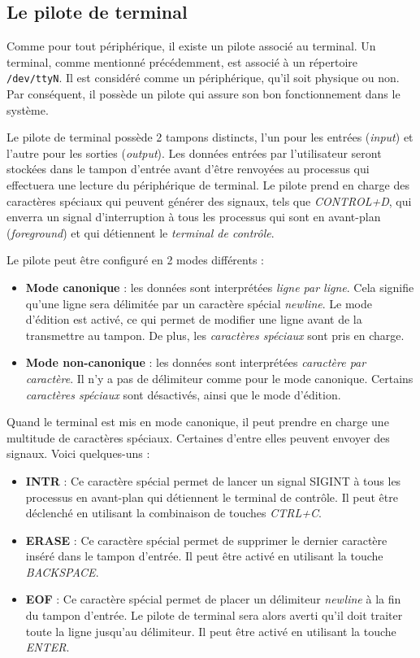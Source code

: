 \subsection{Le pilote de terminal}
Comme pour tout périphérique, il existe un pilote associé au terminal. Un terminal, comme mentionné précédemment, est associé à un répertoire \texttt{/dev/ttyN}. Il est considéré comme un périphérique, qu'il soit physique ou non. Par conséquent, il possède un pilote qui assure son bon fonctionnement dans le système.

Le pilote de terminal possède 2 tampons distincts, l'un pour les entrées (\textit{input}) et l'autre pour les sorties (\textit{output}). Les données entrées par l'utilisateur seront stockées dans le tampon d'entrée avant d'être renvoyées au processus qui effectuera une lecture du périphérique de terminal. Le pilote prend en charge des caractères spéciaux qui peuvent générer des signaux, tels que \textit{CONTROL+D}, qui enverra un signal d'interruption à tous les processus qui sont en avant-plan (\textit{foreground}) et qui détiennent le \textit{terminal de contrôle}.

Le pilote peut être configuré en 2 modes différents :
\begin{itemize}
    \item \textbf{Mode canonique} : les données sont interprétées \textit{ligne par ligne}. Cela signifie qu'une ligne sera délimitée par un caractère spécial \textit{newline}. Le mode d'édition est activé, ce qui permet de modifier une ligne avant de la transmettre au tampon. De plus, les \textit{caractères spéciaux} sont pris en charge.
    \item \textbf{Mode non-canonique} : les données sont interprétées \textit{caractère par caractère}. Il n'y a pas de délimiteur comme pour le mode canonique. Certains \textit{caractères spéciaux} sont désactivés, ainsi que le mode d'édition.
\end{itemize}

\newpage

Quand le terminal est mis en mode canonique, il peut prendre en charge une multitude de caractères spéciaux. Certaines d'entre elles peuvent envoyer des signaux. Voici quelques-uns :

\begin{itemize}
	\item \textbf{INTR} : Ce caractère spécial permet de lancer un signal SIGINT à tous les processus en avant-plan qui détiennent le terminal de contrôle. Il peut être déclenché en utilisant la combinaison de touches \textit{CTRL+C}.
	\item \textbf{ERASE} : Ce caractère spécial permet de supprimer le dernier caractère inséré dans le tampon d'entrée. Il peut être activé en utilisant la touche \textit{BACKSPACE}.
	\item \textbf{EOF} : Ce caractère spécial permet de placer un délimiteur \textit{newline} à la fin du tampon d'entrée. Le pilote de terminal sera alors averti qu'il doit traiter toute la ligne jusqu'au délimiteur. Il peut être activé en utilisant la touche \textit{ENTER}.
\end{itemize}

